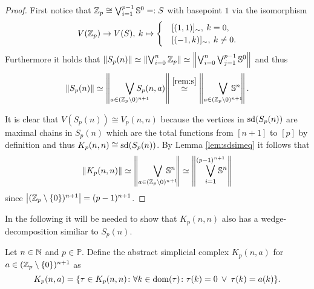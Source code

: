 \begin{proof}
  First notice that $\mathbb{Z}_p \cong \bigvee_{i=1}^{p-1}\mathbb{S}^0 =: S$ with basepoint $1$ via the isomorphism
  \begin{equation*}
    V(\mathbb{Z}_p) \to V(S), \: k \mapsto \begin{cases}
      &[(1, 1)]_\sim, \: k = 0, \\
      &[(-1,k)]_\sim, \: k \neq 0.
    \end{cases}
  \end{equation*}
  Furthermore it holds that $\lVert S_p(n) \rVert \simeq \left\lVert \bigvee_{i=0}^n\mathbb{Z}_p \right\rVert \simeq \left\lVert \bigvee_{i=0}^n\bigvee_{j=1}^{p-1}\mathbb{S}^0 \right\rVert$ and thus
  \begin{equation*}
    \lVert S_p(n) \rVert \simeq \left\lVert \bigvee_{a\in(\Z_p \setminus {0})^{n+1}} \hspace*{-17px}S_p(n,a) \right\rVert \overset{\ref{rem:s}}{\simeq} \left\lVert \bigvee_{a\in(\Z_p \setminus {0})^{n+1}}\hspace*{-15px}\mathbb{S}^n \right\rVert.
  \end{equation*}

  It is clear that $V(S_p(n)) \cong V_p(n,n)$ because the vertices in ${\rm sd}(S_p(n))$ are maximal chains in $S_p(n)$ which are the total functions from $[n+1]$ to $[p]$ by definition and thus $K_p(n,n) \cong {\rm sd}(S_p(n))$. By Lemma \ref{lem:sdsimeq} it follows that
  \begin{equation*}
    \lVert K_p(n, n) \rVert \simeq \left\lVert \bigvee_{a\in(\Z_p \setminus {0})^{n+1}}\hspace*{-15px}\mathbb{S}^n \right\rVert \simeq \left\lVert \bigvee_{i=1}^{(p-1)^{n+1}}\hspace*{-10px}\mathbb{S}^n \right\rVert
  \end{equation*}
  since $\left|(\mathbb{Z}_p\setminus\{0\})^{n+1}\right| = (p-1)^{n+1}$.
\end{proof}

In the following it will be needed to show that $K_p(n,n)$ also has a wedge-decomposition similiar to $S_p(n)$.
\begin{defin}
  Let $n\in\mathbb{N}$ and $p\in \mathbb{P}$. Define the abstract simplicial complex $K_p(n,a)$ for $a \in (\mathbb{Z}_p\setminus\{0\})^{n+1}$ as
  \begin{equation*}
    K_p(n,a) = \{\tau \in K_p(n,n)\colon \forall k\in{\rm dom}(\tau)\colon \tau(k) = 0 \: \lor \: \tau(k) = a(k)\}. \qedhere
  \end{equation*}
\end{defin}

